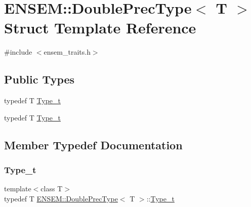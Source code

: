 \hypertarget{structENSEM_1_1DoublePrecType}{}\section{E\+N\+S\+EM\+:\+:Double\+Prec\+Type$<$ T $>$ Struct Template Reference}
\label{structENSEM_1_1DoublePrecType}


{\ttfamily \#include $<$ensem\+\_\+traits.\+h$>$}

\subsection*{Public Types}
\begin{DoxyCompactItemize}
\item 
typedef T \mbox{\hyperlink{structENSEM_1_1DoublePrecType_a3ad79cdc343a0aa27abdd8168287bb65}{Type\+\_\+t}}
\item 
typedef T \mbox{\hyperlink{structENSEM_1_1DoublePrecType_a3ad79cdc343a0aa27abdd8168287bb65}{Type\+\_\+t}}
\end{DoxyCompactItemize}


\subsection{Member Typedef Documentation}
\mbox{\label{structENSEM_1_1DoublePrecType_a3ad79cdc343a0aa27abdd8168287bb65}} 
\subsubsection{\texorpdfstring{Type\_t}{Type\_t}\hspace{0.1cm}{\footnotesize\ttfamily [1/2]}}
{\footnotesize\ttfamily template$<$class T$>$ \\
typedef T \mbox{\hyperlink{structENSEM_1_1DoublePrecType}{E\+N\+S\+E\+M\+::\+Double\+Prec\+Type}}$<$ T $>$\+::\mbox{\hyperlink{structENSEM_1_1DoublePrecType_a3ad79cdc343a0aa27abdd8168287bb65}{Type\+\_\+t}}}

\mbox{\label{structENSEM_1_1DoublePrecType_a3ad79cdc343a0aa27abdd8168287bb65}} 
